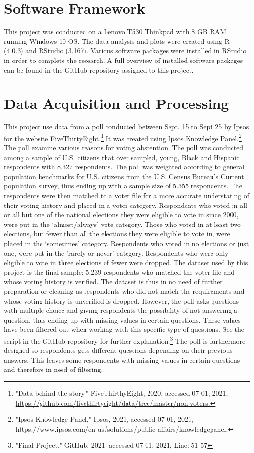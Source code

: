 \documentclass{article}
\begin{document}
\section{Software Framework}
This project was conducted on a Lenovo T530 Thinkpad with 8 GB RAM running Windows 10 OS. The data analysis and plots were created using R (4.0.3) and RStudio (3.167). Various software packages were installed in RStudio in order to complete the research. A full overview of installed software packages can be found in the GitHub repository assigned to this project. 

\section{Data Acquisition and Processing}
This project use data from a poll conducted between Sept. 15 to Sept 25 by Ipsos for the website FiveThirtyEight.\footnote{  "Data behind the story," FiveThirthyEight, 2020, accessed 07-01, 2021, \url{https://github.com/fivethirtyeight/data/tree/master/non-voters.}}   It was created using Ipsos Knowledge Panel.\footnote{  "Ipsos Knowledge Panel," Ipsos, 2021, accessed 07-01, 2021, \url{https://www.ipsos.com/en-us/solutions/public-affairs/knowledgepanel.}}  The poll examine various reasons for voting abstention. The poll was conducted among a sample of U.S. citizens that over sampled, young, Black and Hispanic respondents with 8.327 respondents. The poll was weighted according to general population benchmarks for U.S. citizens from the U.S. Census Bureau’s Current population survey, thus ending up with a sample size of 5.355 respondents. The respondents were then matched to a voter file for a more accurate understating of their voting history and placed in a voter category. Respondents who voted in all or all but one of the national elections they were eligible to vote in since 2000, were put in the ‘almost/always’ vote category. Those who voted in at least two elections, but fewer than all the elections they were eligible to vote in, were placed in the ‘sometimes’ category. Respondents who voted in no elections or just one, were put in the 'rarely or never' category.   Respondents who were only eligible to vote in three elections of fewer were dropped. The dataset used by this project is the final sample: 5.239 respondents who matched the voter file and whose voting history is verified. 
The dataset is thus in no need of further preparation or cleaning as respondents who did not match the requirements and whose voting history is unverified is dropped. However, the poll asks questions with multiple choice and giving respondents the possibility of not answering a question, thus ending up with missing values in certain questions. These values have been filtered out when working with this specific type of questions. See the script in the GitHub repository for further explanation.\footnote{"Final Project," GitHub, 2021, accessed 07-01, 2021, Line: 51-57} The poll is furthermore designed so respondents gets different questions depending on their previous answers. This leaves some respondents with missing values in certain questions and therefore in need of filtering. 
\end{document}
